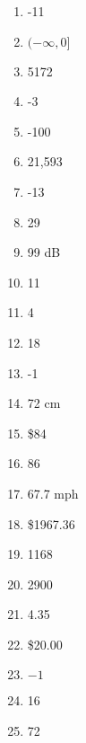\documentclass[../uilmath.tex]{subfiles}
\begin{document}
\begin{enumerate}[label=\bfseries\arabic*.]
    \item %
    -11

    \item %
    $(-\infty, 0]$

    \item %
    5172

    \item %
    -3

    \item %
    -100

    \item %
    21,593

    \item %
    -13

    \item %
    29

    \item %
    99 dB

    \item %
    11
    
    \item %
    4

    \item %
    18

    \item %
    -1

    \item %
    72 cm 

    \item %
    \$84 

    \item %
    86

    \item %
    67.7 mph 

    \item %
    \$1967.36

    \item %
    1168

    \item %
    2900

    \item %
    4.35

    \item %
    \$20.00

    \item %
    $-1$

    \item %
    16

    \item %
    72


\end{enumerate}
\end{document}
